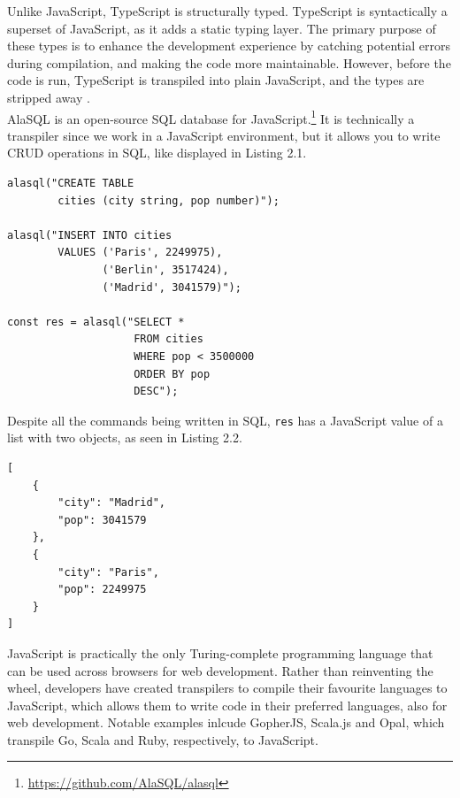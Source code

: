 Unlike JavaScript, TypeScript is structurally typed. TypeScript is syntactically a superset of JavaScript, as it adds a static typing layer. The primary purpose of these types is to enhance the development experience by catching potential errors during compilation, and making the code more maintainable. However, before the code is run, TypeScript is transpiled into plain JavaScript, and the types are stripped away \cite{TypeScript}. \hfill \\

AlaSQL is an open-source SQL database for JavaScript.\footnote{\url{https://github.com/AlaSQL/alasql}} It is technically a transpiler since we work in a JavaScript environment, but it allows you to write CRUD operations in SQL, like displayed in Listing 2.1. \hfill \\

\begin{lstlisting}[caption={JavaScript code to create, populate and select a table with AlaSQL}, captionpos=b]
alasql("CREATE TABLE
        cities (city string, pop number)");

alasql("INSERT INTO cities
        VALUES ('Paris', 2249975),
               ('Berlin', 3517424),
               ('Madrid', 3041579)");

const res = alasql("SELECT *
                    FROM cities
                    WHERE pop < 3500000
                    ORDER BY pop
                    DESC");
\end{lstlisting}

Despite all the commands being written in SQL, \texttt{res} has a JavaScript value of a list with two objects, as seen in Listing 2.2. \hfill \\

\begin{lstlisting}[caption={JSON list with two objects}, captionpos=b]
[
    {
        "city": "Madrid",
        "pop": 3041579
    },
    {
        "city": "Paris",
        "pop": 2249975
    }
]
\end{lstlisting}

JavaScript is practically the only Turing-complete programming language that can be used across browsers for web development. Rather than reinventing the wheel, developers have created transpilers to compile their favourite languages to JavaScript, which allows them to write code in their preferred languages, also for web development. Notable examples inlcude GopherJS, Scala.js and Opal, which transpile Go, Scala and Ruby, respectively, to JavaScript. \hfill \\

